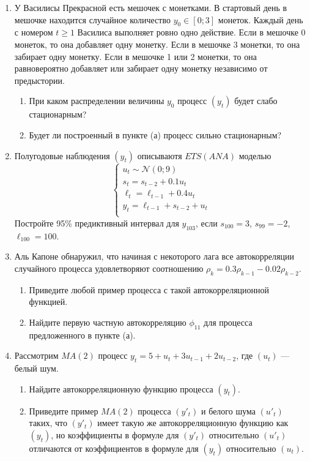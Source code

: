 \documentclass[12pt]{article}
\newcommand \cN{\mathcal{N}}
\begin{document}

\begin{enumerate}

\item У Василисы Прекрасной есть мешочек с монетками. 
В стартовый день в мешочке находится случайное количество $y_0 \in [0;3]$ монеток. 
Каждый день с номером $t\geq 1$ Василиса выполняет ровно одно действие.  
Если в мешочке 0 монеток, то она добавляет одну монетку. 
Если в мешочке 3 монетки, то она забирает одну монетку. 
Если в мешочке 1 или 2 монетки, то она равновероятно добавляет или забирает одну монетку независимо от предыстории. 

\begin{enumerate}
    \item При каком распределении величины $y_0$ процесс $(y_t)$ будет слабо стационарным?
    \item Будет ли построенный в пункте (а) процесс сильно стационарным?
\end{enumerate}


\item Полугодовые наблюдения $(y_t)$ описываютя $ETS(ANA)$ моделью
\[
\begin{cases}
    u_t \sim \cN(0; 9) \\
    s_t = s_{t-2} + 0.1 u_t \\
    \ell_t = \ell_{t-1} + 0.4 u_t \\
    y_t = \ell_{t-1} + s_{t-2} + u_t \\
\end{cases}    
\]
Постройте 95\% предиктивный интервал для $y_{103}$, если $s_{100} = 3$, $s_{99} = -2$, $\ell_{100} = 100$.

    \item Аль Капоне обнаружил, что начиная с некоторого лага все автокорреляции случайного процесса удовлетворяют соотношению 
    $\rho_k = 0.3 \rho_{k - 1} - 0.02 \rho_{k - 2}$.
  \begin{enumerate}
    \item Приведите любой пример процесса с такой автокорреляционной функцией. 
    \item Найдите первую частную автокорреляцию $\phi_{11}$ для процесса предложенного в пункте (а).
  \end{enumerate}
  
\item Рассмотрим $MA(2)$ процесс $y_t = 5 + u_t + 3u_{t-1} + 2u_{t-2}$, где $(u_t)$ — белый шум. 

\begin{enumerate}
    \item Найдите автокорреляционную функцию процесса $(y_t)$.
    \item Приведите пример $MA(2)$ процесса $(y'_t)$ и белого шума $(u'_t)$ таких, 
    что $(y'_t)$ имеет такую же автокорреляционную функцию как $(y_t)$, но коэффициенты в формуле для $(y'_t)$
    относительно $(u'_t)$ отличаются от коэффициентов в формуле для $(y_t)$ относительно $(u_t)$.
\end{enumerate}



\end{enumerate}
\end{document}
